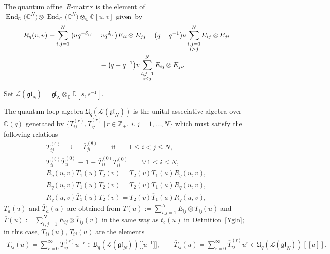 \documentclass[pdftex]{sigma}
\numberwithin{theorem}{section}
\numberwithin{proposition}{section}
\numberwithin{lemma}{section}
\numberwithin{corollary}{section}
\numberwithin{definition}{section}
\numberwithin{example}{section}
\numberwithin{remark}{section}
\numberwithin{note}{section}
\DeclareMathOperator{\End}{End}
\numberwithin{equation}{section}
\begin{document}
\begin{definition}
The quantum af\/f\/ine~$R$-matrix is the element of $\End_{\mathbb{C}}\big(\mathbb{C}^N\big) \otimes
\End_{\mathbb{C}}\big(\mathbb{C}^N\big) \otimes_{\mathbb{C}} \mathbb{C}[u,v]$ given~by
\begin{gather*}
R_q(u,v) = \sum\limits_{i,j=1}^N \big(uq^{-\delta_{ij}} - vq^{\delta_{ij}}\big) E_{ii} \otimes E_{jj} - \big(q-q^{-1}\big)u
\sum\limits_{\substack{i,j=1\\ i > j}}^N E_{ij} \otimes E_{ji}\\
\hphantom{R_q(u,v) =}{}
- \big(q-q^{-1}\big)v \sum\limits_{\substack{i,j=1\\ i < j}}^N E_{ij} \otimes E_{ji}.
\end{gather*}
\end{definition}
Set $\mathcal{L}(\mathfrak{gl}_N)=\mathfrak{gl}_N \otimes_{\mathbb{C}} \mathbb{C}[s,s^{-1}]$.
\begin{definition}
The quantum loop algebra $\mathfrak{U}_q(\mathcal{L}(\mathfrak{gl}_N))$ is the unital associative algebra
over~$\mathbb{C}(q)$ generated by $\{T_{ij}^{(r)},\overline{T}_{ij}^{(r)} \,|\, r\in\mathbb{Z}_+, \; i,j=1,\ldots,N\}$
which must satisfy the following relations
\begin{gather}
T_{ij}^{(0)} = 0 = \overline{T}_{ji}^{(0)} \qquad \text{if} \qquad  1 \leq i<j \leq N,
\nonumber
\\
T_{ii}^{(0)} \overline{T}_{ii}^{(0)} = 1 = \overline{T}_{ii}^{(0)} T_{ii}^{(0)} \qquad \forall\,   1 \leq i \leq N,
\nonumber
\\
R_q(u,v)T_1(u)T_2(v) = T_2(v) T_1(u) R_q(u,v),
\label{RTTql1}
\\
R_q(u,v)\overline{T}_1(u)\overline{T}_2(v) = \overline{T}_2(v) \overline{T}_1(u) R_q(u,v),
\label{RTTql2}
\\
R_q(u,v)\overline{T}_1(u) T_2(v) = T_2(v) \overline{T}_1(u) R_q(u,v),
\label{RTTql3}
\end{gather}
$T_a(u)$ and $\overline{T}_a(u)$ are obtained from $T(u):=\sum\limits_{i,j=1}^N{E_{ij} \otimes T_{ij}(u)}$ and
$\overline{T}(u):=\sum\limits_{i,j=1}^N{E_{ij} \otimes \overline{T}_{ij}(u)}$ in the same way as $t_a(u)$ in
Def\/inition~\ref{Ygln}; in this case, $T_{ij}(u)$, $\overline{T}_{ij}(u)$ are the elements
\begin{gather*}
T_{ij}(u)=\sum\limits_{r=0}^\infty{T_{ij}^{(r)}u^{-r}} \in
\mathfrak{U}_q(\mathcal{L}(\mathfrak{gl}_N))\big[\big[u^{-1}\big]\big],
\qquad
\overline{T}_{ij}(u)=\sum\limits_{r=0}^\infty{\overline{T}_{ij}^{(r)}u^{r}} \in
\mathfrak{U}_q(\mathcal{L}(\mathfrak{gl}_N))[[u]].
\end{gather*}
\end{definition}
\end{document}
